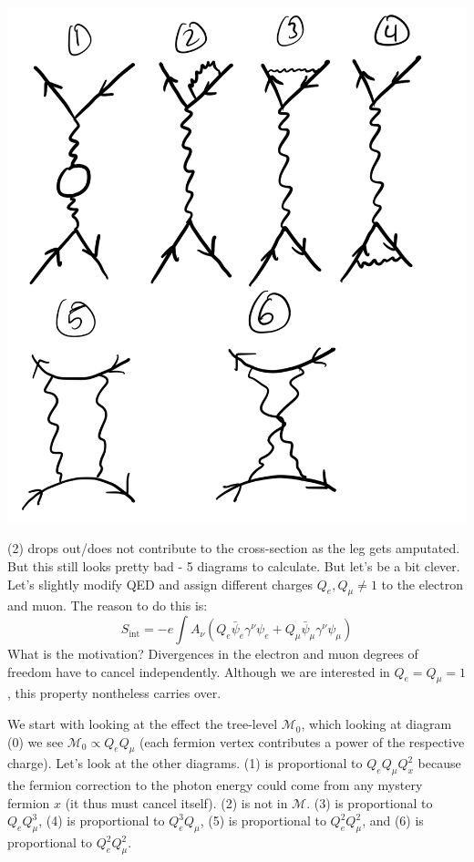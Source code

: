 \begin{center}
    \includegraphics[scale=0.35]{Lectures/Images/lec14-oneloopdiagrams.png}
\end{center}

(2) drops out/does not contribute to the cross-section as the leg gets amputated. But this still looks pretty bad - 5 diagrams to calculate. But let's be a bit clever. Let's slightly modify QED and assign different charges $Q_e, Q_\mu \neq 1$ to the electron and muon. The reason to do this is:
\begin{equation}
    S_{\text{int}} = -e\int A_\nu(Q_e\bar{\psi}_e\gamma^\nu \psi_e + Q_\mu \bar{\psi}_\mu \gamma^\nu \psi_\mu)
\end{equation}
What is the motivation? Divergences in the electron and muon degrees of freedom have to cancel independently. Although we are interested in $Q_e = Q_\mu = 1$, this property nontheless carries over.

We start with looking at the effect the tree-level $\mathcal{M}_0$, which looking at diagram (0) we see $\mathcal{M}_0 \propto Q_eQ_\mu$ (each fermion vertex contributes a power of the respective charge). Let's look at the other diagrams. (1) is proportional to $Q_eQ_\mu Q_x^2$ because the fermion correction to the photon energy could come from any mystery fermion $x$ (it thus must cancel itself). (2) is not in $\mathcal{M}$. (3) is proportional to $Q_eQ_\mu^3$, (4) is proportional to $Q_e^3Q_\mu$, (5) is proportional to $Q_e^2Q_\mu^2$, and (6) is proportional to $Q_e^2Q_\mu^2$.

